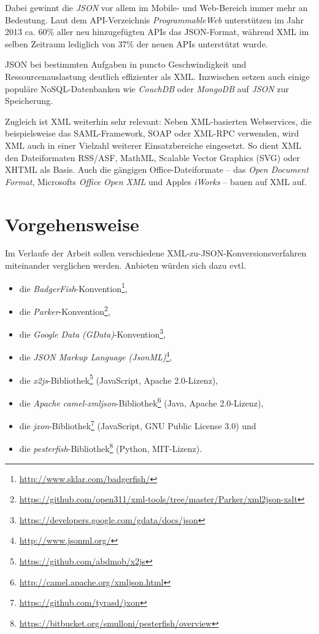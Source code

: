 \documentclass[conference]{template/IEEEtran}
\begin{document}
Dabei gewinnt die \emph{JSON} vor allem im Mobile-
und Web-Bereich immer mehr an Bedeutung. Laut dem API-Verzeichnis
\emph{ProgrammableWeb} unterstützen im Jahr 2013 ca. 60\% aller neu
hinzugefügten APIs das JSON-Format, während XML im selben Zeitraum lediglich
von 37\% der neuen APIs unterstützt wurde.\cite{duvander2013convergence}

JSON bei bestimmten Aufgaben in puncto Geschwindigkeit und Ressourcenauslastung
deutlich effizienter\cite{nurseitov2009comparison} als XML\@. Inzwischen setzen
auch einige populäre NoSQL-Datenbanken wie \emph{CouchDB} oder \emph{MongoDB}
auf \emph{JSON} zur Speicherung.

Zugleich ist XML weiterhin sehr relevant: Neben XML-basierten Webservices, die
beispielsweise das SAML-Framework, SOAP oder XML-RPC verwenden, wird XML auch
in einer Vielzahl weiterer Einsatzbereiche eingesetzt. So dient XML den
Dateiformaten RSS/ASF, MathML, Scalable Vector Graphics (SVG) oder XHTML als
Basis. Auch die gängigen Office-Dateiformate -- das \emph{Open %
Document Format}, Microsofts \emph{Office Open XML} und Apples
\emph{iWorks} -- bauen auf XML auf. %


\section{Vorgehensweise}
Im Verlaufe der Arbeit sollen verschiedene XML-zu-JSON-Konversionsverfahren
miteinander verglichen werden. Anbieten würden sich dazu evtl.

\begin{itemize}
    \item die \emph{BadgerFish}-Konvention\footnote{\url{http://www.sklar.com/badgerfish/}},
    \item die \emph{Parker}-Konvention\footnote{\url{https://github.com/open311/xml-tools/tree/master/Parker/xml2json-xslt}},
    \item die \emph{Google Data (GData)}-Konvention\footnote{\url{https://developers.google.com/gdata/docs/json}},
    \item die \emph{JSON Markup Language (JsonML)}\footnote{\url{http://www.jsonml.org/}},
    \item die \emph{x2js}-Bibliothek\footnote{\url{https://github.com/abdmob/x2js}} (JavaScript, Apache 2.0-Lizenz),
    \item die \emph{Apache camel-xmljson}-Bibliothek\footnote{\url{http://camel.apache.org/xmljson.html}} (Java, Apache 2.0-Lizenz),
    \item die \emph{jxon}-Bibliothek\footnote{\url{https://github.com/tyrasd/jxon}} (JavaScript, GNU Public License 3.0) und
    \item die \emph{pesterfish}-Bibliothek\footnote{\url{https://bitbucket.org/smulloni/pesterfish/overview}} (Python, MIT-Lizenz).
\end{itemize}
\end{document}
